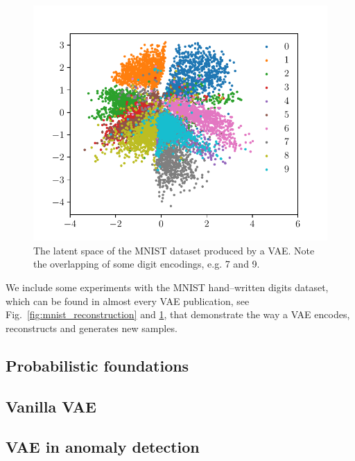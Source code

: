 \begin{figure}
\begin{centering}
\includegraphics[scale=0.8]{data/chapter_survey/mnist_latent}
\par\end{centering}
\caption{The latent space of the MNIST dataset produced by a VAE. Note the
overlapping of some digit encodings, e.g. 7 and 9.}
\label{fig:mnist_latent}
\end{figure}

We include some experiments with the MNIST hand--written digits dataset,
which can be found in almost every VAE publication, see Fig.~\ref{fig:mnist_reconstruction}
and \ref{fig:mnist_latent}, that demonstrate the way a VAE encodes,
reconstructs and generates new samples.



\subsection{Probabilistic foundations}


\subsection{Vanilla VAE\label{sec:vae_vanilla}}


\subsection{VAE in anomaly detection}

